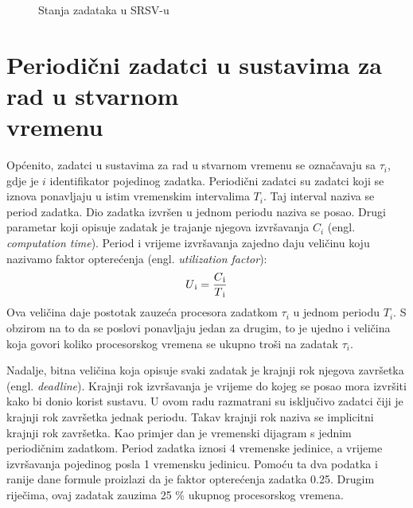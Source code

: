 \documentclass[../zavrsni.tex]{subfiles}
\begin{document}
\begin{figure}[!htb]
    \caption{\label{fig:my-label} Stanja zadataka u SRSV-u}
  \end{figure}

\section{Periodični zadatci u sustavima za rad u stvarnom \\vremenu}

Općenito, zadatci u sustavima za rad u stvarnom vremenu se označavaju sa $\tau_i$, gdje je $i$ identifikator pojedinog zadatka. 
Periodični zadatci su zadatci koji se iznova ponavljaju u istim vremenskim intervalima $T_i$. Taj interval naziva se period zadatka.
Dio zadatka izvršen u jednom periodu naziva se posao.
Drugi parametar koji opisuje zadatak je trajanje njegova izvršavanja $C_i$ (engl. \textit{computation time}). Period i vrijeme izvršavanja zajedno daju veličinu 
koju nazivamo faktor opterećenja (engl. \textit{utilization factor}):
\begin{equation*}
  U\textsubscript{i} = \frac{C\textsubscript{i}}{T\textsubscript{i}}
\end{equation*}
Ova veličina daje postotak zauzeća procesora zadatkom $\tau_i$ u jednom periodu $T_i$. S obzirom na to da se poslovi
ponavljaju jedan za drugim, to je ujedno i veličina koja govori koliko procesorskog vremena se ukupno troši na zadatak $\tau_i$.

Nadalje, bitna veličina koja opisuje svaki zadatak je krajnji rok njegova završetka (engl. \textit{deadline}). Krajnji rok izvršavanja je vrijeme 
do kojeg se posao mora izvršiti kako bi donio korist sustavu. U ovom radu razmatrani su 
isključivo zadatci čiji je krajnji rok završetka jednak periodu. Takav krajnji rok naziva se implicitni krajnji rok završetka. 
Kao primjer dan je vremenski dijagram s jednim periodičnim zadatkom.
Period zadatka iznosi 4 vremenske jedinice, a vrijeme izvršavanja pojedinog posla 1 vremensku jedinicu. Pomoću ta dva podatka i ranije 
dane formule proizlazi da je faktor opterećenja zadatka 0.25. Drugim riječima, ovaj zadatak zauzima 25 \% ukupnog procesorskog vremena.
\end{document}
